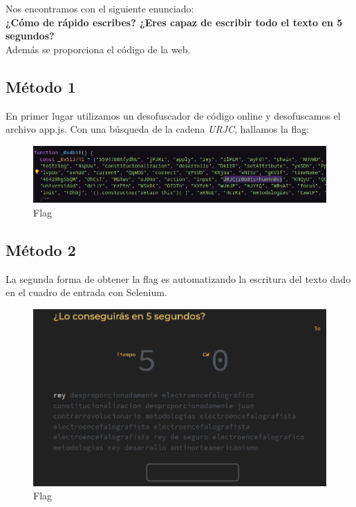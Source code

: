 \documentclass[12pt, a4paper,twoside,titlepage]{article}
\begin{document}
Nos encontramos con el siguiente enunciado:\\
\textbf{¿Cómo de rápido escribes? ¿Eres capaz de escribir todo el texto en 5 segundos?}\\

Además se proporciona el código de la web.\\

\subsection{Método 1}

En primer lugar utilizamos un desofuscador de código online y desofuscamos el archivo app.js. Con una búsqueda de la cadena \emph{URJC}, hallamos la flag:

\begin{figure}[H]
    \centering
    \includegraphics[width=1\linewidth]{Figuras/10FastFingers/Flag.png}
    \caption{Flag}
    \label{fig:my_label}
\end{figure}

\subsection{Método 2}

La segunda forma de obtener la flag es automatizando la escritura del texto dado en el cuadro de entrada con Selenium.

\begin{figure}[H]
    \centering
    \includegraphics[width=1\linewidth]{Figuras/10FastFingers/Init.png}
    \caption{Flag}
    \label{fig:my_label}
\end{figure}
\end{document}
